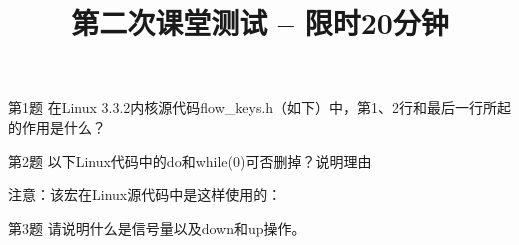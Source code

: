 \documentclass[xcolor=svgnames]{beamer}
\begin{document}
\begin{CJK*}{UTF8}{gbsn}


\title{第二次课堂测试 -- 限时20分钟}

\maketitle

\begin{frame}{第1题}
在Linux 3.3.2内核源代码flow\_keys.h（如下）中，第1、2行和最后一行所起的作用是什么？
\lstset{language=C, frame=trbl}


\end{frame}

\begin{frame}{第2题}
以下Linux代码中的do和while(0)可否删掉？说明理由
\lstset{language=C, frame=trbl}

\alert{注意}：该宏在Linux源代码中是这样使用的：
\lstset{language=C, frame=trbl}


\end{frame}

\begin{frame}{第3题}
请说明什么是信号量以及down和up操作。
\end{frame}

\end{CJK*}
\end{document}
